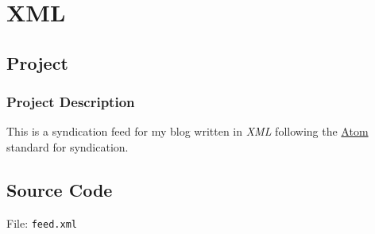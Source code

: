 \section{XML}\label{sec:xml}

\subsection{Project}

\subsubsection*{Project Description}

This is a syndication feed for my blog written in \textit{XML} following the \href{http://www.w3.org/2005/Atom}{Atom} standard for syndication.


\subsection{Source Code}

File: \texttt{feed.xml}
